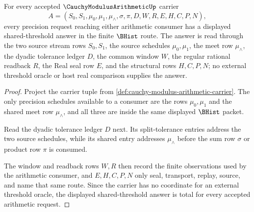 \begin{theorem}
\label{thm:cauchymodulusarithmetic-shared-threshold-totality}
For every accepted $\CauchyModulusArithmeticUp$ carrier
$$
A=(S_0,S_1,\mu_0,\mu_1,\mu_{\wedge},\sigma,\pi,D,W,R,E,H,C,P,N),
$$
every precision request reaching either arithmetic consumer has a displayed
shared-threshold answer in the finite $\BHist$ route. The answer is read through
the two source stream rows $S_0,S_1$, the source schedules $\mu_0,\mu_1$, the meet
row $\mu_{\wedge}$, the dyadic tolerance ledger $D$, the common window $W$, the
regular rational readback $R$, the Real seal row $E$, and the structural rows
$H,C,P,N$; no external threshold oracle or host real comparison supplies the
answer.
\end{theorem}
\begin{proof}
Project the carrier tuple from
\autoref{def:cauchy-modulus-arithmetic-carrier}. The only precision schedules
available to a consumer are the rows $\mu_0,\mu_1$ and the shared meet row
$\mu_{\wedge}$, and all three are inside the same displayed $\BHist$ packet.

Read the dyadic tolerance ledger $D$ next. Its split-tolerance entries address
the two source schedules, while its shared entry addresses $\mu_{\wedge}$ before
the sum row $\sigma$ or product row $\pi$ is consumed.

The window and readback rows $W,R$ then record the finite observations used by
the arithmetic consumer, and $E,H,C,P,N$ only seal, transport, replay, source,
and name that same route. Since the carrier has no coordinate for an external
threshold oracle, the displayed shared-threshold answer is total for every
accepted arithmetic request.
\end{proof}

